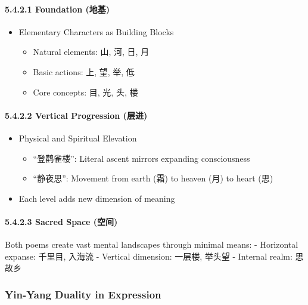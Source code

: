 \documentclass[11pt,letterpaper]{article}
\begin{document}
\paragraph{5.4.2.1 Foundation (地基)}\label{foundation-ux5730ux57fa}

\begin{itemize}
\tightlist
\item
  Elementary Characters as Building Blocks

  \begin{itemize}
  \tightlist
  \item
    Natural elements: 山, 河, 日, 月
  \item
    Basic actions: 上, 望, 举, 低
  \item
    Core concepts: 目, 光, 头, 楼
  \end{itemize}
\end{itemize}

\paragraph{5.4.2.2 Vertical Progression
(层进)}\label{vertical-progression-ux5c42ux8fdb}

\begin{itemize}
\tightlist
\item
  Physical and Spiritual Elevation

  \begin{itemize}
  \tightlist
  \item
    ``登鹳雀楼'': Literal ascent mirrors expanding consciousness
  \item
    ``静夜思'': Movement from earth (霜) to heaven (月) to heart (思)
  \end{itemize}
\item
  Each level adds new dimension of meaning
\end{itemize}

\paragraph{5.4.2.3 Sacred Space
(空间)}\label{sacred-space-ux7a7aux95f4}

Both poems create vast mental landscapes through minimal means: -
Horizontal expanse: 千里目, 入海流 - Vertical dimension: 一层楼, 举头望
- Internal realm: 思故乡

\subsubsection{Yin-Yang Duality in Expression}\label{yin-yang-duality-in-expression}
\end{document}
